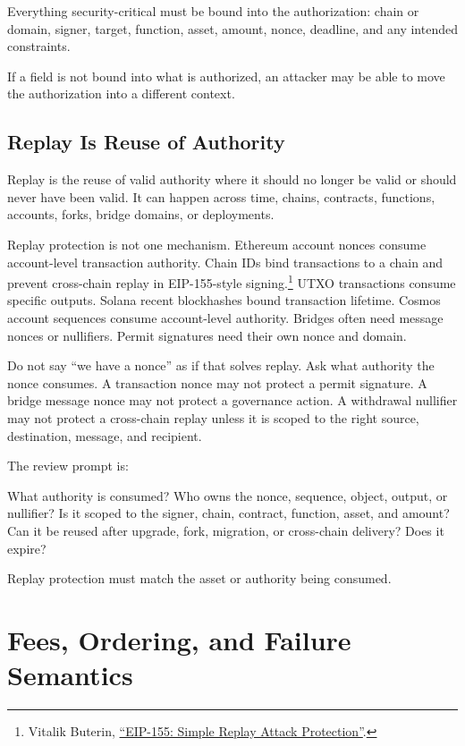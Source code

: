 \begin{codeblock}
Everything security-critical must be bound into the authorization:
chain or domain, signer, target, function, asset, amount, nonce,
deadline, and any intended constraints.
\end{codeblock}

If a field is not bound into what is authorized, an attacker may be able to move the authorization into a different context.

\subsection{Replay Is Reuse of Authority}

Replay is the reuse of valid authority where it should no longer be valid or should never have been valid. It can happen across time, chains, contracts, functions, accounts, forks, bridge domains, or deployments.

Replay protection is not one mechanism. Ethereum account nonces consume account-level transaction authority. Chain IDs bind transactions to a chain and prevent cross-chain replay in EIP-155-style signing.\footnote{Vitalik Buterin, \href{https://eips.ethereum.org/EIPS/eip-155}{``EIP-155: Simple Replay Attack Protection''}.} UTXO transactions consume specific outputs. Solana recent blockhashes bound transaction lifetime. Cosmos account sequences consume account-level authority. Bridges often need message nonces or nullifiers. Permit signatures need their own nonce and domain.

Do not say ``we have a nonce'' as if that solves replay. Ask what authority the nonce consumes. A transaction nonce may not protect a permit signature. A bridge message nonce may not protect a governance action. A withdrawal nullifier may not protect a cross-chain replay unless it is scoped to the right source, destination, message, and recipient.

The review prompt is:

\begin{codeblock}
What authority is consumed?
Who owns the nonce, sequence, object, output, or nullifier?
Is it scoped to the signer, chain, contract, function, asset, and amount?
Can it be reused after upgrade, fork, migration, or cross-chain delivery?
Does it expire?
\end{codeblock}

Replay protection must match the asset or authority being consumed.

\section{Fees, Ordering, and Failure Semantics}


